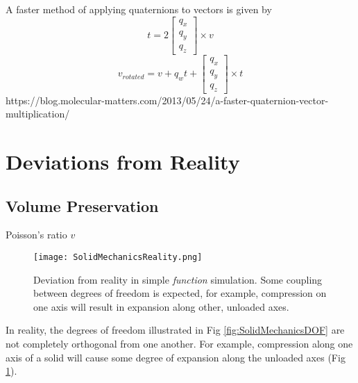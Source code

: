 {A faster method of applying quaternions to vectors is given by
\[ t = 2 \left[ \begin{array}{ccc}
q_x\\
q_y\\
q_z
 \end{array} \right] \times v\]
\[ v_{rotated} = v + q_wt +  \left[ \begin{array}{ccc}
q_x\\
q_y\\
q_z
 \end{array} \right] \times t\]
 https://blog.molecular-matters.com/2013/05/24/a-faster-quaternion-vector-multiplication/


\section{Deviations from Reality}

\subsection{Volume Preservation}

Poisson's ratio $v$

\begin{figure}
  \texttt{[image: SolidMechanicsReality.png]}
  \caption{Deviation from reality in simple \textit{function} simulation.  Some coupling between degrees of freedom is expected, for example, compression on one axis will result in expansion along other, unloaded axes.}
  \label{fig:SolidMechanicsReality}
\end{figure}

In reality, the degrees of freedom illustrated in Fig \ref{fig:SolidMechanicsDOF} are not completely orthogonal from one another.  For example, compression along one axis of a solid will cause some degree of expansion along the unloaded axes (Fig \ref{fig:SolidMechanicsReality}).


}
